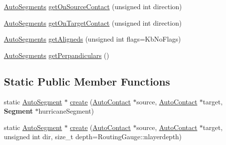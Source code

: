 \begin{DoxyCompactItemize}
\item 
\hyperlink{namespaceKatabatic_a2221b0ddbc24f331809fc86f98e38041}{Auto\-Segments} \hyperlink{classKatabatic_1_1AutoSegment_a4430f9704a59e1d4f7c37d7166649510}{get\-On\-Source\-Contact} (unsigned int direction)
\item 
\hyperlink{namespaceKatabatic_a2221b0ddbc24f331809fc86f98e38041}{Auto\-Segments} \hyperlink{classKatabatic_1_1AutoSegment_aadbb84c0f1383f6a2addc2661e388583}{get\-On\-Target\-Contact} (unsigned int direction)
\item 
\hyperlink{namespaceKatabatic_a2221b0ddbc24f331809fc86f98e38041}{Auto\-Segments} \hyperlink{classKatabatic_1_1AutoSegment_aaca749f49cd03ca06449d5ea2104033a}{get\-Aligneds} (unsigned int flags=Kb\-No\-Flags)
\item 
\hyperlink{namespaceKatabatic_a2221b0ddbc24f331809fc86f98e38041}{Auto\-Segments} \hyperlink{classKatabatic_1_1AutoSegment_aadc6427db83ebdb690e74980d9c8d7d8}{get\-Perpandiculars} ()
\end{DoxyCompactItemize}
\subsection*{Static Public Member Functions}
\begin{DoxyCompactItemize}
\item 
static \hyperlink{classKatabatic_1_1AutoSegment}{Auto\-Segment} $\ast$ \hyperlink{classKatabatic_1_1AutoSegment_ab0cc9e57beeceec519cd4bd3e415569e}{create} (\hyperlink{classKatabatic_1_1AutoContact}{Auto\-Contact} $\ast$source, \hyperlink{classKatabatic_1_1AutoContact}{Auto\-Contact} $\ast$target, {\bf Segment} $\ast$hurricane\-Segment)
\item 
static \hyperlink{classKatabatic_1_1AutoSegment}{Auto\-Segment} $\ast$ \hyperlink{classKatabatic_1_1AutoSegment_afa7ce652576b17985859fd6c29d21489}{create} (\hyperlink{classKatabatic_1_1AutoContact}{Auto\-Contact} $\ast$source, \hyperlink{classKatabatic_1_1AutoContact}{Auto\-Contact} $\ast$target, unsigned int dir, size\-\_\-t depth=Routing\-Gauge\-::nlayerdepth)
\end{DoxyCompactItemize}
